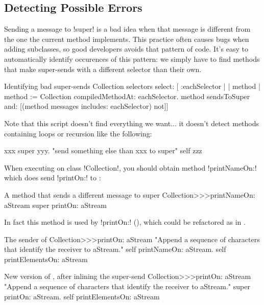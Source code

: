 \documentclass[a4paper,10pt,twoside]{book}
\begin{document}
\subsection{Detecting Possible Errors}

Sending a message to \ct!super! is a bad idea when that message is different from the one the current method implements.
This practice often causes bugs when adding subclasses, so good developers avoids that pattern of code.
It's easy to automatically identify occurences of this pattern: we simply have to find methods that make super-sends with a different selector than their own.

\begin{script}[findSuperSends]{Identifying bad super-sends}
Collection selectors select: [ :eachSelector |
	| method |
	method := Collection compiledMethodAt: eachSelector.
	method sendsToSuper and: [(method messages includes: eachSelector) not]]
\end{script}

Note that this script doesn't find everything we want... it doesn't detect methods containing loops or recursion like the following:
\begin{code}{}
xxx
	super yyy. "send something else than xxx to super"
	self zzz
\end{code}

When executing  on class \ct!Collection!, you should obtain method \ct!printNameOn:! which does send \ct!printOn:! to \super:
\begin{method}[printNameOn]{A method that sends a different message to super}
Collection>>>printNameOn: aStream
	super printOn: aStream
\end{method}

In fact this method is used by \ct!printOn:! (), which could be refactored as in .

\begin{method}[oldPrintOn]{The sender of }
Collection>>>printOn: aStream
	"Append a sequence of characters that identify the receiver to aStream."
	self printNameOn: aStream.
	self printElementsOn: aStream
\end{method}

\begin{method}[newPrintOn]{New version of , after inlining the  super-send}
Collection>>>printOn: aStream
	"Append a sequence of characters that identify the receiver to aStream."
	super printOn: aStream.
	self printElementsOn: aStream
\end{method}
\end{document}
